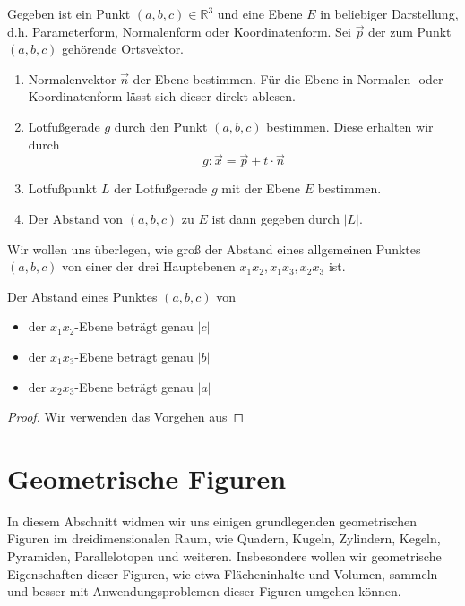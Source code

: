 \begin{problem} Gegeben ist ein Punkt \((a,b,c)\in \mathbb R^3\) und eine Ebene \(E\) in beliebiger Darstellung, d.h. Parameterform, Normalenform oder Koordinatenform. Sei \(\vec p\) der zum Punkt \((a,b,c)\) gehörende Ortsvektor. 
\begin{enumerate}
    \item Normalenvektor \(\vec n\) der Ebene bestimmen. Für die Ebene in Normalen- oder Koordinatenform lässt sich dieser direkt ablesen. 
    \item Lotfußgerade \(g\) durch den Punkt \((a,b,c)\) bestimmen. Diese erhalten wir durch 
    \begin{equation*}
        g: \vec x = \vec p + t\cdot \vec n
    \end{equation*}
    \item Lotfußpunkt \(L\) der Lotfußgerade \(g\) mit der Ebene \(E\) bestimmen. 
    \item Der Abstand von \((a,b,c)\) zu \(E\) ist dann gegeben durch \(|L|\). 
\end{enumerate}
    
\end{problem}

Wir wollen uns überlegen, wie groß der Abstand eines allgemeinen Punktes \((a,b,c)\) von einer der drei Hauptebenen \(x_1x_2, x_1x_3,x_2x_3\) ist.
\begin{proposition}
    Der Abstand eines Punktes \((a,b,c)\) von 
    \begin{itemize}
        \item der \(x_1x_2\)-Ebene beträgt genau \(|c|\)
        \item der \(x_1x_3\)-Ebene beträgt genau \(|b|\)
        \item der \(x_2x_3\)-Ebene beträgt genau \(|a|\)
    \end{itemize}
\end{proposition}
\begin{proof}
    Wir verwenden das Vorgehen aus 
\end{proof}

\section{Geometrische Figuren}
In diesem Abschnitt widmen wir uns einigen grundlegenden geometrischen Figuren im dreidimensionalen Raum, wie Quadern, Kugeln, Zylindern, Kegeln, Pyramiden, Parallelotopen und weiteren. Insbesondere wollen wir geometrische Eigenschaften dieser Figuren, wie etwa Flächeninhalte und Volumen, sammeln und besser mit Anwendungsproblemen dieser Figuren umgehen können. 

